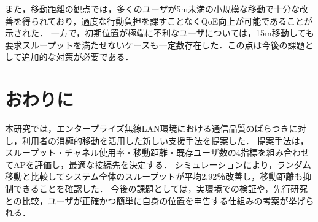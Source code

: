 \documentclass[dvipdfmx,twocolumn]{jsarticle}
\newcommand{\Note}[1]{\noindent \textbf{\textcolor{blue}{#1}}}
\begin{document}
また，移動距離の観点では，多くのユーザが5m未満の小規模な移動で十分な改善を得られており，過度な行動負担を課すことなくQoE向上が可能であることが示された．
一方で，初期位置が極端に不利なユーザについては，15m移動しても要求スループットを満たせないケースも一定数存在した．この点は今後の課題として追加的な対策が必要である．

\section{おわりに}
本研究では，エンタープライズ無線LAN環境における通信品質のばらつきに対し，利用者の消極的移動を活用した新しい支援手法を提案した．
提案手法は，スループット・チャネル使用率・移動距離・既存ユーザ数の4指標を組み合わせてAPを評価し，最適な接続先を決定する．
シミュレーションにより，ランダム移動と比較してシステム全体のスループットが平均2.92％改善し，移動距離も抑制できることを確認した．
今後の課題としては，実環境での検証や，先行研究との比較，ユーザが正確かつ簡単に自身の位置を申告する仕組みの考案が挙げられる．



\end{document}
